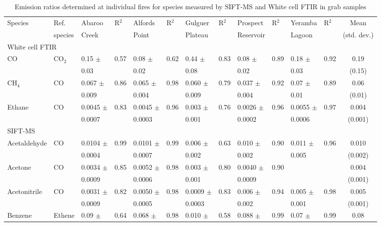 \documentclass[acp, manuscript]{copernicus}
\begin{document}
\begin{sidewaystable}
  \caption{Emission ratios determined at individual fires for species measured by SIFT-MS and White cell FTIR in grab samples}
  \begin{tabular}{l l l l l l l l l l l l c }
    \hline
    Species& Ref. & Abaroo & R$^2$ & Alfords  & R$^2$&Gulguer  &R$^2$&Prospect &R$^2$&Yeramba&R$^2$& Mean  \\
    &species& Creek&&Point &&Plateau &&Reservoir&& Lagoon &&(std. dev.)\\
    \hline 
    \multicolumn{2}{l}{White cell FTIR} &&&&&&&&&&&\\ 
    \hline 
    CO& CO$_2$& 0.15 $\pm$ &0.57&0.08 $\pm$  & 0.62&0.44 $\pm$  & 0.83 & 0.08 $\pm$  & 0.89& 0.18 $\pm$ & 0.92 & 0.19  \\
    &&0.03&&0.02&&0.08&&0.02&&0.03&&(0.15)\\
    CH$_4$ & CO & 0.067 $\pm$  & 0.86 & 0.065 $\pm$ &0.98 & 0.060 $\pm$ & 0.79 & 0.037 $\pm$  & 0.92 & 0.07 $\pm$  &0.89&0.06 \\
    &&0.009&&0.004&&0.009&&0.004&&0.01&&(0.01)\\
    Ethane&CO&0.0045 $\pm$ &0.83&0.0045 $\pm$ &0.96&0.003 $\pm$ &0.76&0.0026 $\pm$ &0.96&0.0055 $\pm$ & 0.97&0.004\\
    && 0.0007&& 0.0003&& 0.001&& 0.0002&& 0.0006&&(0.001)\\
    \hline
    SIFT-MS & && & &&&&&&&&\\ 
    \hline
    Acetaldehyde & CO &0.0104 $\pm$ &0.99&0.0101 $\pm$ &0.99&0.006 $\pm$ & 0.63&0.010 $\pm$ &0.90&0.011 $\pm$ &0.96&0.010\\
     && 0.0004&& 0.0007&& 0.002&& 0.002&& 0.005&&(0.002)\\
    Acetone & CO & 0.0034 $\pm$&0.85&0.0052 $\pm$&0.98&0.003 $\pm$&0.80& 0.0040 $\pm$&0.90&&&0.004 \\
    &&0.0009&&0.0006&&0.001&&0.0009&&&&(0.001)\\
    Acetonitrile & CO & 0.0031 $\pm$ &0.82&0.0050 $\pm$&0.98&0.0009 $\pm$&0.83&0.006 $\pm$&0.94&0.005 $\pm$&0.98&0.005\\
    &&0.0009&&0.0005&&0.0003&&0.002&&0.001&&(0.001)\\
    Benzene & Ethene &0.09 $\pm$ &0.64&0.068 $\pm$&0.98&0.010 $\pm$& 0.58&0.088 $\pm$&0.99&0.07 $\pm$&0.99&0.08 \\

\end{tabular}
\end{sidewaystable}
\end{document}
